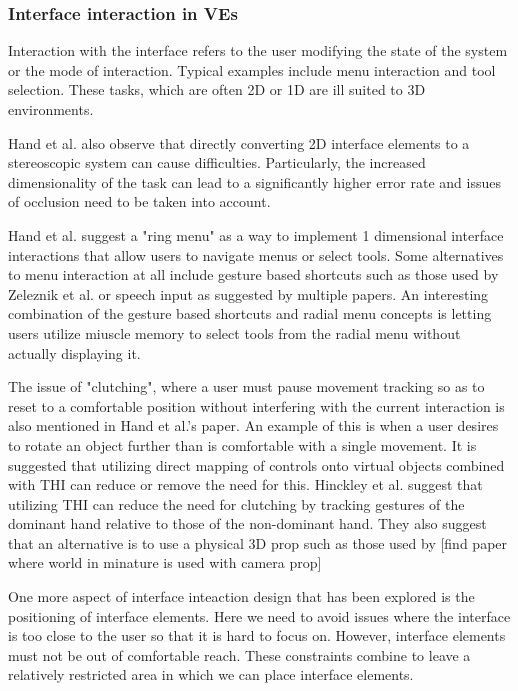 \documentclass{sig-alternate-05-2015}
\begin{document}
\subsubsection{Interface interaction in VEs}
 Interaction with the interface refers to the user modifying the state of the system or the mode of interaction\cite{Bowman2001}. Typical examples include menu interaction and tool selection. These tasks, which are often 2D or 1D are ill suited to 3D environments\cite{Bowman2001, Hand1997}.
 
 Hand et al. also observe that directly converting 2D interface elements to a stereoscopic system can cause difficulties.\cite{Hand1997} Particularly, the increased dimensionality of the task can lead to a significantly higher error rate and issues of occlusion need to be taken into account.
 
 Hand et al. suggest a "ring menu" as a way to implement 1 dimensional interface interactions that allow users to navigate menus or select tools.\cite{Hand1997} Some alternatives to menu interaction at all include gesture based shortcuts such as those used by Zeleznik et al.\cite{Zeleznik2007} or speech input as suggested by multiple papers. \cite{VanDam1997,Bowman2001,Hand1997} An interesting combination of the gesture based shortcuts and radial menu concepts is letting users utilize miuscle memory to select tools from the radial menu without actually displaying it.\cite{Kurtenbach1993}
 
 The issue of "clutching", where a user must pause movement tracking so as to reset to a comfortable position without interfering with the current interaction is also mentioned in Hand et al.'s paper.\cite{Hand1997} An example of this is when a user desires to rotate an object further than is comfortable with a single movement. It is suggested that utilizing direct mapping of controls onto virtual objects combined with THI can reduce or remove the need for this.\cite{Hand1997}  Hinckley et al. suggest that utilizing THI can reduce the need for clutching by tracking gestures of the dominant hand relative to those of the non-dominant hand.\cite{Hinckley1994} They also suggest that an alternative is to use a physical 3D prop such as those used by [find paper where world in minature is used with camera prop]
 
 One more aspect of interface inteaction design that has been explored is the positioning of interface elements.\cite{alger2015visual} Here we need to avoid issues where the interface is too close to the user so that it is hard to focus on. However, interface elements must not be out of comfortable reach. These constraints combine to leave a relatively restricted area in which we can place interface elements.
 
\end{document}
